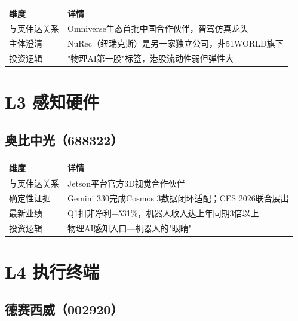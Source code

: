 \begin{table}[H]
\centering\small
\renewcommand{\arraystretch}{1.3}
\begin{tabularx}{\textwidth}{l X}
\toprule
\textbf{维度} & \textbf{详情} \\
\midrule
与英伟达关系 & Omniverse生态首批中国合作伙伴，智驾仿真龙头 \\
主体澄清 & \textcolor{riskred}{NuRec（纽瑞克斯）是另一家独立公司，非51WORLD旗下} \\
投资逻辑 & "物理AI第一股"标签，港股流动性弱但弹性大 \\
\bottomrule
\end{tabularx}
\end{table}

\section{L3 感知硬件}

\subsection{奥比中光（688322）--- \starfive{}}

\begin{table}[H]
\centering\small
\renewcommand{\arraystretch}{1.3}
\begin{tabularx}{\textwidth}{l X}
\toprule
\textbf{维度} & \textbf{详情} \\
\midrule
与英伟达关系 & Jetson平台官方3D视觉合作伙伴 \\
确定性证据 & Gemini 330完成Cosmos 3数据闭环适配；CES 2026联合展出 \\
最新业绩 & Q1扣非净利+531\%，机器人收入达上年同期3倍以上 \\
投资逻辑 & 物理AI感知入口---机器人的"眼睛" \\
\bottomrule
\end{tabularx}
\end{table}

\section{L4 执行终端}

\subsection{德赛西威（002920）--- \starfive{}}

